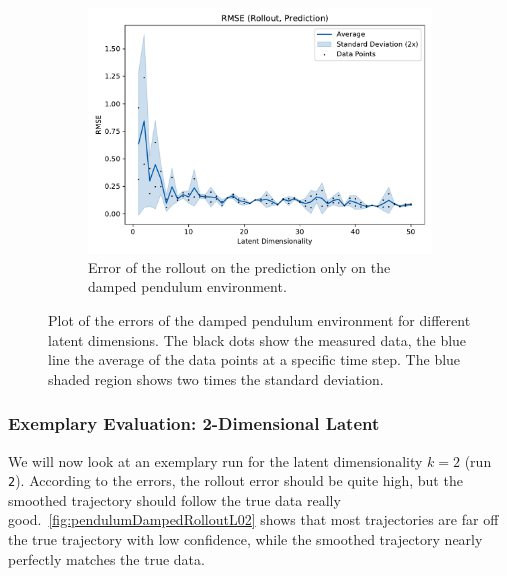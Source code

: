 \begin{figure}
\begin{subfigure}{0.5\linewidth}
					\label{fig:pendulumDampedRmseTrain}
				\end{subfigure}%
				~
				\begin{subfigure}{0.5\linewidth}
					\centering
					\includegraphics[width=\linewidth]{figures/results/pendulum-damped/latent-dim/comparison-rmse-rollout-prediction-mean-vs-latent-dim.pdf}
					\caption{Error of the rollout on the prediction only on the damped pendulum environment.}
					\label{fig:pendulumDampedRmsePred}
				\end{subfigure}
				\caption{Plot of the errors of the damped pendulum environment for different latent dimensions. The black dots show the measured data, the blue line the average of the data points at a specific time step. The blue shaded region shows two times the standard deviation.}
				\label{fig:pendulumDampedRmse}
			\end{figure}

		\subsubsection{Exemplary Evaluation: 2-Dimensional Latent}
			We will now look at an exemplary run for the latent dimensionality \( k = 2 \) (run \texttt{2}). According to the errors, the rollout error should be quite high, but the smoothed trajectory should follow the true data really good.~\autoref{fig:pendulumDampedRolloutL02} shows that most trajectories are far off the true trajectory with low confidence, while the smoothed trajectory nearly perfectly matches the true data.

